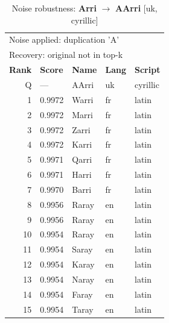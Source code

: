 \begin{table}[htbp]
\centering
\small
\caption{Noise robustness: \textbf{Arri} $\rightarrow$ \textbf{AArri} [uk, cyrillic]}
\label{tab:noise-16}
\begin{tabular}{rllll}
\toprule
\multicolumn{5}{l}{\small Noise applied: duplication 'A'} \\
\multicolumn{5}{l}{\small Recovery: original not in top-k} \\
\midrule
\textbf{Rank} & \textbf{Score} & \textbf{Name} & \textbf{Lang} & \textbf{Script} \\
\midrule
\rowcolor{gray!20} Q & --- & AArri & uk & cyrillic \\
\midrule
1 & 0.9972 & Warri & fr & latin \\
2 & 0.9972 & Marri & fr & latin \\
3 & 0.9972 & Zarri & fr & latin \\
4 & 0.9972 & Karri & fr & latin \\
5 & 0.9971 & Qarri & fr & latin \\
6 & 0.9971 & Harri & fr & latin \\
7 & 0.9970 & Barri & fr & latin \\
8 & 0.9956 & Raray & en & latin \\
9 & 0.9956 & Raray & en & latin \\
10 & 0.9954 & Raray & en & latin \\
11 & 0.9954 & Saray & en & latin \\
12 & 0.9954 & Karay & en & latin \\
13 & 0.9954 & Naray & en & latin \\
14 & 0.9954 & Faray & en & latin \\
15 & 0.9954 & Taray & en & latin \\
\bottomrule
\end{tabular}
\end{table}


